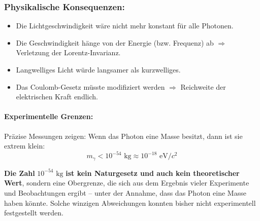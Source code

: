 \subsubsection*{Physikalische Konsequenzen:}
\begin{itemize}
	\item Die Lichtgeschwindigkeit w\"are nicht mehr konstant f\"ur alle Photonen.
	\item Die Geschwindigkeit h\"ange von der Energie (bzw. Frequenz) ab $\Rightarrow$ Verletzung der Lorentz-Invarianz.
	\item Langwelliges Licht w\"urde langsamer als kurzwelliges.
	\item Das Coulomb-Gesetz m\"usste modifiziert werden $\Rightarrow$ Reichweite der elektrischen Kraft endlich.
\end{itemize}

\paragraph{Experimentelle Grenzen:}
Pr\"azise Messungen zeigen: Wenn das Photon eine Masse besitzt, dann ist sie extrem klein:
\begin{equation}
	m_\gamma < 10^{-54} \text{ kg} \approx 10^{-18} \text{ eV}/c^2
\end{equation}

\textbf{Die Zahl} $10^{-54} \text{ kg}$ 	\textbf{ist kein Naturgesetz und auch kein theoretischer Wert}, sondern eine Obergrenze, die sich aus dem Ergebnis vieler Experimente und Beobachtungen ergibt – unter der Annahme, dass das Photon eine Masse haben könnte.
Solche winzigen Abweichungen konnten bisher nicht experimentell festgestellt werden.

